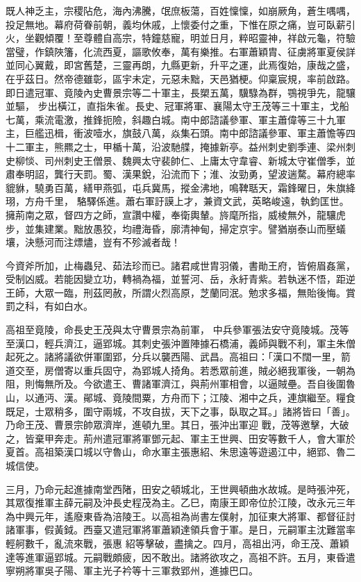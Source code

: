 \begin{pinyinscope}
 既人神乏主，宗稷阽危，海內沸騰，氓庶板蕩，百姓懍懍，如崩厥角，蒼生喁喁，投足無地。幕府荷眷前朝，義均休戚，上懷委付之重，下惟在原之痛，豈可臥薪引火，坐觀傾覆！至尊體自高宗，特鐘慈寵，明並日月，粹昭靈神，祥啟元龜，符驗當璧，作鎮陜籓，化流西夏，謳歌攸奉，萬有樂推。右軍蕭穎胄、征虜將軍夏侯詳並同心翼戴，即宮舊楚，三靈再朗，九縣更新，升平之運，此焉復始，康哉之盛，在乎茲日。然帝德雖彰，區宇未定，元惡未黜，天邑猶梗。仰稟宸規，率前啟路。即日遣冠軍、竟陵內史曹景宗等二十軍主，長槊五萬，驥騄為群，鶚視爭先，龍驤並驅，
 步出橫江，直指朱雀。長史、冠軍將軍、襄陽太守王茂等三十軍主，戈船七萬，乘流電激，推鋒扼險，斜趣白城。南中郎諮議參軍、軍主蕭偉等三十九軍主，巨艦迅楫，衝波噎水，旗鼓八萬，焱集石頭。南中郎諮議參軍、軍主蕭憺等四十二軍主，熊羆之士，甲楯十萬，沿波馳艓，掩據新亭。益州刺史劉季連、梁州刺史柳惔、司州刺史王僧景、魏興太守裴帥仁、上庸太守韋睿、新城太守崔僧季，並肅奉明詔，龔行天罰。蜀、漢果銳，沿流而下；淮、汝勁勇，望波遄騖。幕府總率貔貅，驍勇百萬，繕甲燕弧，屯兵冀馬，摐金沸地，鳴鞞聒天，霜鋒曜日，朱旗絳珝，方舟千里，
 駱驛係進。蕭右軍訏謨上才，兼資文武，英略峻遠，執鈞匡世。擁荊南之眾，督四方之師，宣讚中權，奉衛輿輦。旍麾所指，威棱無外，龍驤虎步，並集建業。黜放愚狡，均禮海昏，廓清神甸，掃定京宇。譬猶崩泰山而壓蟻壤，決懸河而注熛燼，豈有不殄滅者哉！



 今資斧所加，止梅蟲兒、茹法珍而已。諸君咸世胄羽儀，書勛王府，皆俯眉姦黨，受制凶威。若能因變立功，轉禍為福，並誓河、岳，永紆青紫。若執迷不悟，距逆王師，大眾一臨，刑茲罔赦，所謂火烈高原，芝蘭同泯。勉求多福，無貽後悔。賞罰之科，有如白水。



 高祖至竟陵，命長史王茂與太守曹景宗為前軍，
 中兵參軍張法安守竟陵城。茂等至漢口，輕兵濟江，逼郢城。其刺史張沖置陣據石橋浦，義師與戰不利，軍主朱僧起死之。諸將議欲併軍圍郢，分兵以襲西陽、武昌。高祖曰：「漢口不闊一里，箭道交至，房僧寄以重兵固守，為郢城人掎角。若悉眾前進，賊必絕我軍後，一朝為阻，則悔無所及。今欲遣王、曹諸軍濟江，與荊州軍相會，以逼賊壘。吾自後圍魯山，以通沔、漢。鄖城、竟陵間粟，方舟而下；江陵、湘中之兵，連旗繼至。糧食既足，士眾稍多，圍守兩城，不攻自拔，天下之事，臥取之耳。」諸將皆曰「善」。乃命王茂、曹景宗帥眾濟岸，進頓九里。其日，張沖出軍迎
 戰，茂等邀擊，大破之，皆棄甲奔走。荊州遣冠軍將軍鄧元起、軍主王世興、田安等數千人，會大軍於夏首。高祖築漢口城以守魯山，命水軍主張惠紹、朱思遠等遊遏江中，絕郢、魯二城信使。



 三月，乃命元起進據南堂西陼，田安之頓城北，王世興頓曲水故城。是時張沖死，其眾復推軍主薛元嗣及沖長史程茂為主。乙巳，南康王即帝位於江陵，改永元三年為中興元年，遙廢東昏為涪陵王。以高祖為尚書左僕射，加征東大將軍、都督征討諸軍事，假黃鉞。西臺又遣冠軍將軍蕭穎達領兵會于軍。是日，元嗣軍主沈難當率輕舸數千，亂流來戰，張惠
 紹等擊破，盡擒之。四月，高祖出沔，命王茂、蕭穎達等進軍逼郢城。元嗣戰頗疲，因不敢出。諸將欲攻之，高祖不許。五月，東昏遣寧朔將軍吳子陽、軍主光子衿等十三軍救郢州，進據巴口。




\end{pinyinscope}
